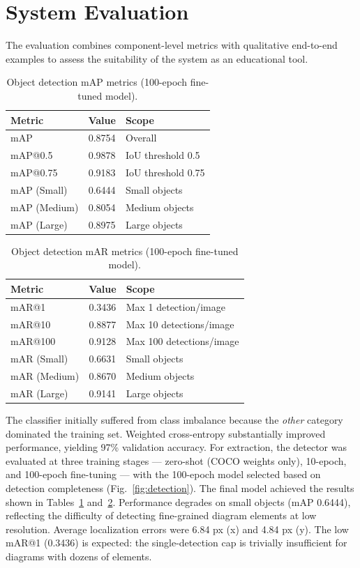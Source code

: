 \documentclass[conference]{IEEEtran}
\begin{document}
\section{System Evaluation}
The evaluation combines component-level metrics with qualitative end-to-end examples to assess the suitability of the system as an educational tool.

\begin{table}[htbp]
\centering
\caption{Object detection mAP metrics (100-epoch fine-tuned model).}
\label{tab:map}
\begin{tabular}{|l|c|l|}
\hline
\textbf{Metric} & \textbf{Value} & \textbf{Scope} \\
\hline
mAP       & 0.8754 & Overall \\
mAP@0.5   & 0.9878 & IoU threshold 0.5 \\
mAP@0.75  & 0.9183 & IoU threshold 0.75 \\
\hline
mAP (Small)  & 0.6444 & Small objects \\
mAP (Medium) & 0.8054 & Medium objects \\
mAP (Large)  & 0.8975 & Large objects \\
\hline
\end{tabular}
\end{table}

\begin{table}[htbp]
\centering
\caption{Object detection mAR metrics (100-epoch fine-tuned model).}
\label{tab:mar}
\begin{tabular}{|l|c|l|}
\hline
\textbf{Metric} & \textbf{Value} & \textbf{Scope} \\
\hline
mAR@1   & 0.3436 & Max 1 detection/image \\
mAR@10  & 0.8877 & Max 10 detections/image \\
mAR@100 & 0.9128 & Max 100 detections/image \\
\hline
mAR (Small)  & 0.6631 & Small objects \\
mAR (Medium) & 0.8670 & Medium objects \\
mAR (Large)  & 0.9141 & Large objects \\
\hline
\end{tabular}
\end{table}

The classifier initially suffered from class imbalance because the \textit{other} category dominated the training set. Weighted cross-entropy substantially improved performance, yielding 97\% validation accuracy. For extraction, the detector was evaluated at three training stages — zero-shot (COCO weights only), 10-epoch, and 100-epoch fine-tuning — with the 100-epoch model selected based on detection completeness (Fig.~\ref{fig:detection}). The final model achieved the results shown in Tables~\ref{tab:map} and~\ref{tab:mar}. Performance degrades on small objects (mAP 0.6444), reflecting the difficulty of detecting fine-grained diagram elements at low resolution. Average localization errors were 6.84 px (x) and 4.84 px (y). The low mAR@1 (0.3436) is expected: the single-detection cap is trivially insufficient for diagrams with dozens of elements.
\end{document}
